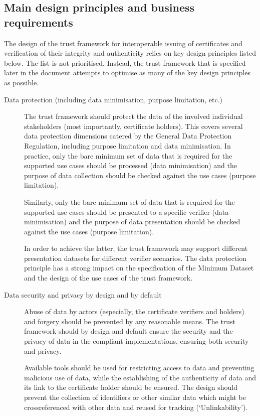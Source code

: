 \documentclass[a4paper,12pt,english,openany]{sphinxmanual}
\begin{document}
\subsection{Main design principles and business requirements}
\label{\detokenize{privacycred:main-design-principles-and-business-requirements}}
\sphinxAtStartPar
The design of the trust framework for interoperable issuing of certificates and verification of their integrity and authenticity relies on key design principles listed below. The list is not prioritised. Instead, the trust framework that is specified later in the document attempts to optimise as many of the key design principles as possible.
\begin{description}
\item[{Data protection (including data minimisation, purpose limitation, etc.)}] \leavevmode
\sphinxAtStartPar
The trust framework should protect the data of the involved individual stakeholders (most importantly, certificate holders). This covers several data protection dimensions catered by the General Data Protection Regulation, including purpose limitation and data minimisation. In practice, only the bare minimum set of data that is required for the supported use cases should be processed (data minimisation) and the purpose of data collection should be checked against the use cases (purpose limitation).

\sphinxAtStartPar
Similarly, only the bare minimum set of data that is required for the supported use cases should be presented to a specific verifier (data minimisation) and the purpose of data presentation should be checked against the use cases (purpose limitation).

\sphinxAtStartPar
In order to achieve the latter, the trust framework may support different presentation datasets for different verifier scenarios. The data protection principle has a strong impact on the specification of the Minimum Dataset and the design of the use cases of the trust framework.

\item[{Data security and privacy by design and by default}] \leavevmode
\sphinxAtStartPar
Abuse of data by actors (especially, the certificate verifiers and holders) and forgery should be prevented by any reasonable means. The trust framework should by design and default ensure the security and the privacy of data in the compliant implementations, ensuring both security and privacy.

\sphinxAtStartPar
Available tools should be used for restricting access to data and preventing malicious use of data, while the establishing of the authenticity of data and its link to the certificate holder should be ensured. The design should prevent the collection of identifiers or other similar data which might be crossreferenced with other data and re\sphinxhyphen{}used for tracking (‘Unlinkability’).


\end{description}
\end{document}
